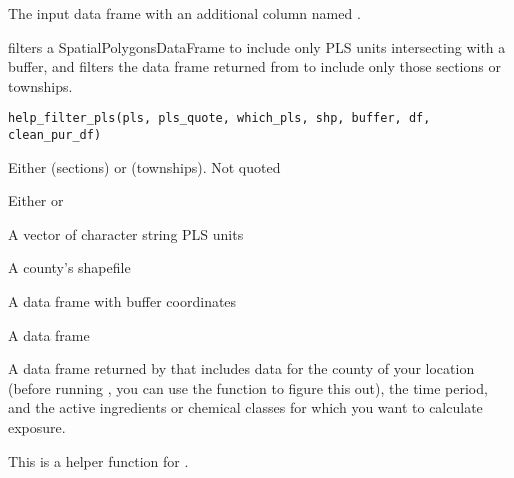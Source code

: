 \documentclass[a4paper]{book}
\begin{document}
%
\begin{Value}
The input  data frame with an additional column
named .
\end{Value}
%
\begin{Description}\relax
{} filters a SpatialPolygonsDataFrame to include only PLS
units intersecting with a buffer, and filters the data frame returned from
 to include only those sections or townships.
\end{Description}
%
\begin{Usage}
\begin{verbatim}
help_filter_pls(pls, pls_quote, which_pls, shp, buffer, df, clean_pur_df)
\end{verbatim}
\end{Usage}
%
\begin{Arguments}
\begin{ldescription}
\item[\code{pls}] Either  (sections) or  (townships). Not quoted

\item[\code{pls\_quote}] Either  or 

\item[\code{which\_pls}] A vector of character string PLS units

\item[\code{shp}] A county's shapefile

\item[\code{buffer}] A data frame with buffer coordinates

\item[\code{df}] A data frame

\item[\code{clean\_pur\_df}] A data frame returned by  that
includes data for the county of your location (before running
, you can use the 
function to figure this out), the time period, and the active ingredients
or chemical classes for which you want to calculate exposure.
\end{ldescription}
\end{Arguments}
%
\begin{Details}\relax
This is a helper function for .
\end{Details}
%
\end{document}
